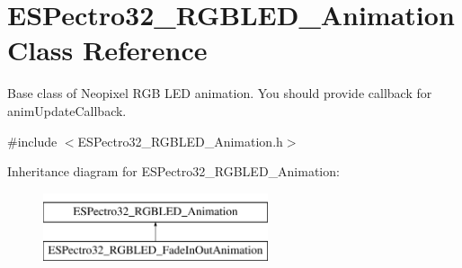 \hypertarget{classESPectro32__RGBLED__Animation}{\section{E\-S\-Pectro32\-\_\-\-R\-G\-B\-L\-E\-D\-\_\-\-Animation Class Reference}
\label{classESPectro32__RGBLED__Animation}
}


Base class of Neopixel R\-G\-B L\-E\-D animation. You should provide callback for anim\-Update\-Callback.  




{\ttfamily \#include $<$E\-S\-Pectro32\-\_\-\-R\-G\-B\-L\-E\-D\-\_\-\-Animation.\-h$>$}

Inheritance diagram for E\-S\-Pectro32\-\_\-\-R\-G\-B\-L\-E\-D\-\_\-\-Animation\-:\begin{figure}[H]
\begin{center}
\leavevmode
\includegraphics[height=2.000000cm]{classESPectro32__RGBLED__Animation}
\end{center}
\end{figure}
